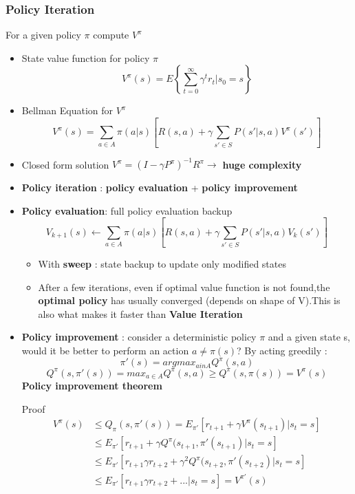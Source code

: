 \documentclass[12pt]{article} %
\begin{document}
\subsubsection{Policy Iteration}
For a given policy $\pi$ compute $V^{\pi}$
\begin{itemize}
\item State value function for policy $\pi$ 
$$ V^{\pi} (s) = E \left\{ \sum_{t=0}^{\infty} \gamma^tr_t|s_0=s \right\}$$

\item Bellman Equation for $V^{\pi}$
$$ V^{\pi} (s)= \sum_{a \in A} \pi(a|s) \left[ R(s,a) + \gamma \sum_{s' \in S}P(s'|s,a)V^{\pi}(s') \right]$$

\item Closed form solution $V^{\pi} = (I-\gamma P^{\pi})^{-1}R^{\pi} \rightarrow$ \textbf{huge complexity}

\item \textbf{Policy iteration} : \textbf{policy evaluation} + \textbf{policy improvement} 

\item \textbf{Policy evaluation}: full policy evaluation backup
$$ V_{k+1} (s) \leftarrow \sum_{a \in A} \pi(a|s) \left[ R(s,a) + \gamma \sum_{s' \in S}P(s'|s,a)V_k(s') \right]$$
\begin{itemize}
\item With \textbf{sweep} : state backup to update only modified states
\item After a few iterations, even if optimal value function is not found,the \textbf{optimal policy} has usually converged (depends on shape of V).This is also what makes it faster than \textbf{Value Iteration}
\end{itemize}

\item \textbf{Policy improvement} : consider a deterministic policy $\pi$ and a given state s, would it be better to perform an action $a \neq \pi(s)$? By acting greedily : 
$$ \pi'(s) = argmax_{a in A}Q^{\pi}(s,a)$$
$$ Q^{\pi}(s, \pi'(s))=max_{a \in A}Q^{\pi}(s,a) \geq Q^{\pi}(s,\pi(s))= V^{\pi}(s)$$
\textbf{Policy improvement theorem
}\begin{center}
\end{center}
Proof 
\begin{align*}
V^{\pi}(s) &\leq Q_{\pi}(s,\pi'(s)) = E_{\pi'}[r_{t+1} + \gamma V^{\pi}(s_{t+1})|s_t=s] \\
&\leq E_{\pi'}[r_{t+1} + \gamma Q^{\pi}(s_{t+1},\pi'(s_{t+1})|s_t=s]\\
&\leq E_{\pi'}[r_{t+1} \gamma r_{t+2}+ \gamma^2 Q^{\pi}(s_{t+2},\pi'(s_{t+2})|s_t=s]\\
&\leq E_{\pi'}[r_{t+1} \gamma r_{t+2}+... |s_t=s]= V^{\pi'}(s)
\end{align*}


\end{itemize}
\end{document}
